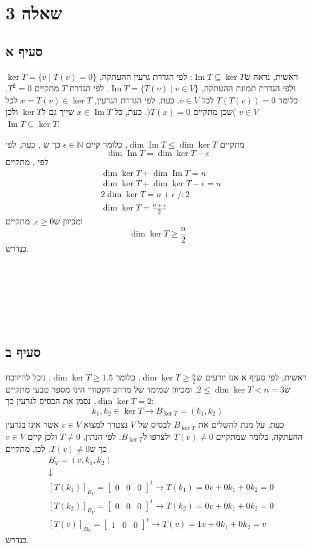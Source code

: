 \documentclass[11pt, oneside]{article}
\newcommand{\qed}{\R{$\blacksquare$}}
\newcommand{\br}{\\\\\\\\\\\\\\}
\newcommand{\opr}[1]{\xrightarrow[\text{#1}]{}}
\newcommand{\mN}{\mathbb{N}}
\newcommand{\m}[3]{\R{משפט #3#2.#1}}
\DeclareMathOperator{\Ima}{Im}
\newcommand{\tir}[3]{\begin{bmatrix}#1 & #2 & #3\end{bmatrix}}
\begin{document}
\section{שאלה 3}
\subsection{סעיף א}
ראשית, נראה ש$\Ima{T} \subseteq \ker{T}$: לפי הגדרת גרעין ההעתקה, $\ker{T} = \{v \mid T(v) = 0\}$ ולפי הגדרת תמונת ההעתקה, $\Ima{T} = \{T(v) \mid v \in V\}$. לפי הגדרת $T$ מתקיים $T^2 = 0$, כלומר $T(T(v)) = 0$ לכל $v \in V$. כעת, לפי הגדרת הגרעין, $x = T(v) \in \ker{T}$ לכל $v \in V$ )שכן מתקיים $T(x) = 0$(. כעת, כל $x \in \Ima{T}$ שייך גם ל$\ker{T}$ ולכן $\Ima{T} \subseteq \ker{T}$.

כעת, לפי \m{8}{3}{4.},‎ מתקיים $\dim{\Ima{T}} \le \dim{\ker{T}}$, כלומר קיים $\epsilon \in \mN$ כך ש
\[
\dim{\Ima{T}} = \dim{\ker{T}} -‎ \epsilon
\]
לפי \m{9}{6}{1.}, מתקיים
\begin{align*}
& \dim{\ker{T}} + \dim{\Ima{T}} = n\\
& \dim{\ker{T}} + \dim{\ker{T}} - \epsilon = n\\
& 2\dim{\ker{T}} = n + \epsilon\;/:2\\
& \dim{\ker{T}} = \frac{n + \epsilon}{2}
\end{align*}
ומכיוון ש$\epsilon \ge 0$, מתקיים
\[
\dim{\ker{T}} \ge \frac{n}{2}
\]
כנדרש.
\br\qed

\subsection{סעיף ב}
ראשית, לפי סעיף א אנו יודעים ש$\dim{\ker{T}} \ge \frac{n}{2}$, כלומר $\dim{\ker{T}} \ge 1.5$. נוכל להיווכח ש$2 \le \dim{\ker{T}} < n = 3$, ומכיוון שמימד של מרחב ווקטורי הינו מספר טבעי מתקיים $\dim{\ker{T}} = 2$. נסמן את הבסיס לגרעין כך:
\[
k_1, k_2 \in \ker{T} \opr{} B_{\ker{T}} = (k_1, k_2)
\]
כעת, על מנת להשלים את $B_{\ker{T}}$ לבסיס של $V$ נצטרך למצוא $v \in V$ אשר אינו בגרעין ההעתקה, כלומר שמתקיים $T(v) \neq 0$ ולצרפו ל$B_{\ker{T}}$. לפי הנתון, $T \neq 0$ ולכן קיים $v \in V$ כך ש$T(v) \neq 0$. לכן, מתקיים
\begin{eqnarray*}
& B_V = (v, k_1, k_2)\\
& \downarrow\\
& [T(k_1)]_{B_V} = \tir{0}{0}{0}^t \opr{} T(k_1) = 0v + 0k_1 + 0k_2 = 0\\
& [T(k_2)]_{B_V} = \tir{0}{0}{0}^t \opr{} T(k_2) = 0v + 0k_1 + 0k_2 = 0\\
& [T(v)]_{B_V} = \tir{1}{0}{0}^t \opr{} T(v) = 1v + 0k_1 + 0k_2 = v
\end{eqnarray*}
כנדרש.
\br\qed
\clearpage
\end{document}
